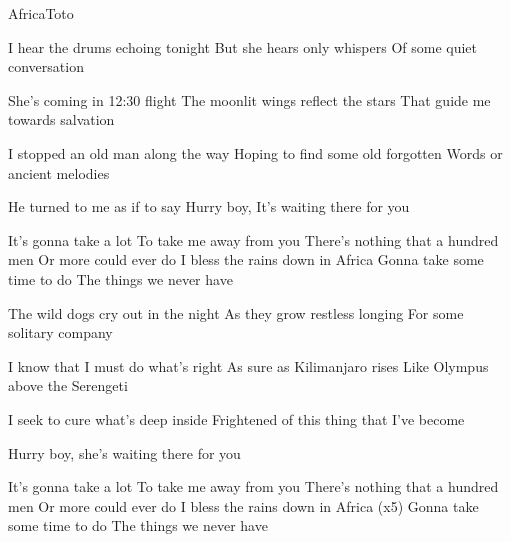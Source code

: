 \documentclass[a4paper,11pt,french]{article}
\begin{document}

\begin{Song}{Africa}{Toto}
\begin{multicols}{2}
\begin{Verse}
I hear the drums echoing tonight 
But she hears only whispers 
Of some quiet conversation
\espaceInterStrophe

She's coming in 12:30 flight 
The moonlit wings reflect the stars 
That guide me towards salvation 
\espaceInterStrophe

I stopped an old man along the way 
Hoping to find some old forgotten 
Words or ancient melodies
\espaceInterStrophe

He turned to me as if to say
Hurry boy, It's waiting there for you 
\end{Verse}
\espaceInterStrophe

\begin{Chorus}
It's gonna take a lot 
To take me away from you 
There's nothing that a hundred men 
Or more could ever do 
I bless the rains down in Africa 
Gonna take some time to do 
The things we never have 
\end{Chorus}
\vfill
\columnbreak

\begin{Verse}
The wild dogs cry out in the night 
As they grow restless longing 
For some solitary company
\espaceInterStrophe
 
I know that I must do what's right 
As sure as Kilimanjaro rises 
Like Olympus above the Serengeti 
\espaceInterStrophe

I seek to cure what's deep inside
Frightened of this thing that I've become 
\end{Verse}
\espaceInterStrophe

\tochorus
\espaceInterStrophe

\espaceInterStrophe

\begin{Verse}
Hurry boy, she's waiting there for you 
\end{Verse}
\espaceInterStrophe

\begin{Chorus}
It's gonna take a lot 
To take me away from you 
There's nothing that a hundred men 
Or more could ever do 
I bless the rains down in Africa (x5)
Gonna take some time to do 
The things we never have 
\end{Chorus}
\end{multicols}


\end{Song}
\end{document}
